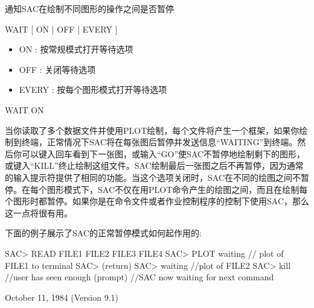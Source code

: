 \label{cmd:wait}

通知SAC在绘制不同图形的操作之间是否暂停

WAIT [ ON | OFF | EVERY ]

\begin{itemize}
\item ON : 按常规模式打开等待选项 
\item OFF : 关闭等待选项 
\item EVERY : 按每个图形模式打开等待选项
\end{itemize}

WAIT ON

当你读取了多个数据文件并使用PLOT绘制，每个文件将产生一个框架，如果你绘制到终端，正常情况下SAC将在每张图后暂停并发送信息``WAITING''到终端。然后你可以键入回车看到下一张图，或输入``GO''使SAC不暂停地绘制剩下的图形，或键入``KILL''终止绘制这组文件。SAC绘制最后一张图之后不再暂停，因为通常的输入提示符提供了相同的功能。当这个选项关闭时，SAC在不同的绘图之间不暂停。在每个图形模式下，SAC不仅在用PLOT命令产生的绘图之间，而且在绘制每个图形时都暂停。如果你是在命令文件或者作业控制程序的控制下使用SAC，那么这一点将很有用。

下面的例子展示了SAC的正常暂停模式如何起作用的:
\begin{SACCode}
SAC> READ FILE1 FILE2 FILE3 FILE4
SAC> PLOT
  waiting  // plot of FILE1 to terminal
SAC> (return)
SAC> waiting  //plot of FILE2
SAC> kill  //user has seen enough
  (prompt) //SAC now waiting for next command
\end{SACCode}

October 11, 1984 (Version 9.1)

